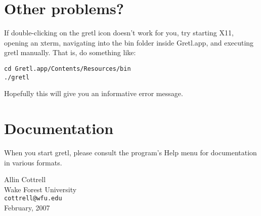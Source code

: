 \documentclass[11pt]{article}
\begin{document}
\section{Other problems?}

If double-clicking on the gretl icon doesn't work for you, try
starting X11, opening an xterm, navigating into the \textsf{bin}
folder inside \textsf{Gretl.app}, and executing \textsf{gretl}
manually.  That is, do something like:

\begin{verbatim}
cd Gretl.app/Contents/Resources/bin
./gretl
\end{verbatim}

Hopefully this will give you an informative error message.

\section{Documentation}
\label{sec:doc}

When you start gretl, please consult the program's Help menu for
documentation in various formats.

\vspace{.25in}

\raggedright
Allin Cottrell \\
Wake Forest University \\
\texttt{cottrell@wfu.edu} \\
February, 2007
\end{document}
